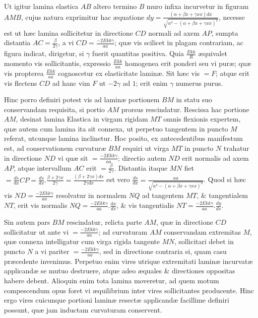 Ut igitur lamina elastica $AB$ altero termino $B$ muro infixa incurvetur in figuram $AMB$, cujus natura exprimitur hac æquatione $dy=\frac{(\alpha+\beta x+\gamma xx)dx}{\sqrt{a^4-(\alpha+\beta x+\gamma xx)^2}}$, necesse est ut hæc lamina sollicitetur in directione $CD$ normali ad axem $AP$, sumpta distantia $AC=\frac\beta{2\gamma}$, a vi $CD=\frac{-2Ekk\gamma}{aa}$; quæ vis scilicet in plagam contrariam, ac figura indicat, dirigetur, si $\gamma$ fuerit quantitas positiva. Quia $\frac{Ekk}{R}$ æquivalet momento vis sollicitantis, expressio $\frac{Ekk}{aa}$ homogenea erit ponderi seu vi puræ; quæ vis propterea $\frac{Ekk}{aa}$ cognoscetur ex elasticitate laminæ. Sit hæc vis $=F$; atque erit vis flectens $CD$ ad hanc vim $F$ ut $-2\gamma$ ad $1$; erit enim $\gamma$ numerus purus.

Hinc porro definiri potest vis ad laminæ portionem $BM$ in statu suo conservandam requisita, si portio $AM$ prorsus rescindatur. Rescissa hac portione $AM$, desinat lamina Elastica in virgam rigidam $MT$ omnis flexionis expertem, quæ autem cum lamina ita sit connexa, ut perpetuo tangentem in puncto $M$ referat, utcunque lamina inclinetur. Hoc posito, ex antecedentibus manifestum est, ad conservationem curvaturæ $BM$ requiri ut virga $MT$ in puncto $N$ trahatur in directione $ND$ vi quæ sit $=\frac{-2Ekk\gamma}{aa}$; directio autem $ND$ erit normalis ad axem $AP$, atque intervallum $AC$ erit $=\frac\beta{2\gamma}$. Distantia itaque $MN$ fiet $=\frac{ds}{dx}CP=\frac{ds}{dx}.\frac{\beta+2\gamma x}{2\gamma}=\frac{(\beta+2\gamma x)ds}{2\gamma dx}$ est vero $\frac{ds}{dx}=\frac{aa}{\sqrt{a^4-(\alpha+\beta x+\gamma xx)^2}}$. Quod si hæc vis $ND=\frac{-2Ekk\gamma}{aa}$ resolvatur in normalem $NQ$ ad tangentem $MT$, \& tangentialem $NT$, erit vis normalis $NQ=\frac{-2Ekk\gamma}{aa}.\frac{dx}{ds}$, \& vis tangentialis $NT=\frac{-2Ekk\gamma}{aa}.\frac{dy}{ds}$.

Sin autem pars $BM$ rescindatur, relicta parte $AM$, quæ in directione $CD$ sollicitatur ut ante vi $=\frac{-2Ekk\gamma}{aa}$; ad curvaturam $AM$ conservandam extremitas $M$, quæ connexa intelligatur cum virga rigida tangente $MN$, sollicitari debet in puncto $N$ a vi pariter $=\frac{-2Ekk\gamma}{aa}$, sed in directione contraria
ei, quam casu præcedente invenimus. Perpetuo enim vires utrique extremitati laminæ incurvatæ applicandæ se mutuo destruere, atque adeo æquales \& directiones oppositas habere debent. Alioquin enim tota lamina moveretur, ad quem motum compescendum opus foret vi æquilibrium inter vires sollicitantes producente. Hinc ergo vires cuicunque portioni laminæ resectæ applicandæ facillime definiri possunt, quæ jam inductam curvaturam conservent.

